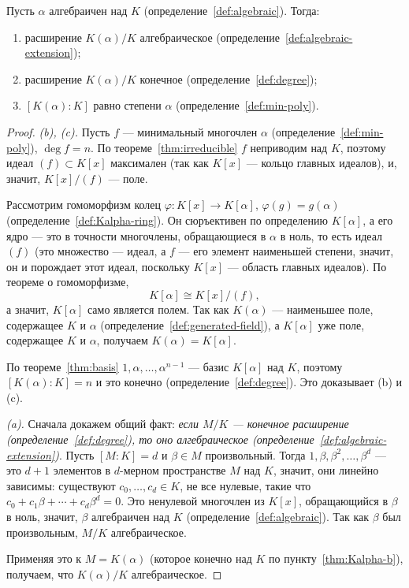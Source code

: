 \documentclass[12pt]{article}
\begin{document}
    \begin{theorem}\label{thm:Kalpha}
    	Пусть $\alpha$ алгебраичен над $K$ (определение~\ref{def:algebraic}). Тогда:
    	\begin{enumerate}
    		\item[(a)] \label{thm:Kalpha-a} расширение $K(\alpha)/K$ алгебраическое (определение~\ref{def:algebraic-extension});
    		\item[(b)] \label{thm:Kalpha-b} расширение $K(\alpha)/K$ конечное (определение~\ref{def:degree});
    		\item[(c)] \label{thm:Kalpha-c} $[K(\alpha):K]$ равно степени $\alpha$ (определение~\ref{def:min-poly}).
    	\end{enumerate}
    \end{theorem}
    \begin{proof}
    	\emph{(b), (c).} Пусть $f$ --- минимальный многочлен $\alpha$ (определение~\ref{def:min-poly}), $\deg f = n$. По теореме~\ref{thm:irreducible} $f$ неприводим над $K$, поэтому идеал $(f) \subset K[x]$ максимален (так как $K[x]$ --- кольцо главных идеалов), и, значит, $K[x]/(f)$ --- поле.
    
    	Рассмотрим гомоморфизм колец $\varphi: K[x] \to K[\alpha]$, $\varphi(g) = g(\alpha)$ (определение~\ref{def:Kalpha-ring}). Он сюръективен по определению $K[\alpha]$, а его ядро --- это в точности многочлены, обращающиеся в $\alpha$ в ноль, то есть идеал $(f)$ (это множество --- идеал, а $f$ --- его элемент наименьшей степени, значит, он и порождает этот идеал, поскольку $K[x]$ --- область главных идеалов). По теореме о гомоморфизме,
    	\[
    	K[\alpha] \cong K[x]/(f),
    	\]
    	а значит, $K[\alpha]$ само является полем. Так как $K(\alpha)$ --- наименьшее поле, содержащее $K$ и $\alpha$ (определение~\ref{def:generated-field}), а $K[\alpha]$ уже поле, содержащее $K$ и $\alpha$, получаем $K(\alpha) = K[\alpha]$.
    
    	По теореме~\ref{thm:basis} $1, \alpha, \ldots, \alpha^{n-1}$ --- базис $K[\alpha]$ над $K$, поэтому $[K(\alpha):K] = n$ и это конечно (определение~\ref{def:degree}). Это доказывает (b) и (c).
    
    	\emph{(a).} Сначала докажем общий факт: \emph{если $M/K$ --- конечное расширение (определение~\ref{def:degree}), то оно алгебраическое (определение~\ref{def:algebraic-extension})}\label{lem:finite-algebraic}. Пусть $[M:K] = d$ и $\beta \in M$ произвольный. Тогда $1, \beta, \beta^2, \ldots, \beta^d$ --- это $d+1$ элементов в $d$-мерном пространстве $M$ над $K$, значит, они линейно зависимы: существуют $c_0, \ldots, c_d \in K$, не все нулевые, такие что $c_0 + c_1\beta + \cdots + c_d\beta^d = 0$. Это ненулевой многочлен из $K[x]$, обращающийся в $\beta$ в ноль, значит, $\beta$ алгебраичен над $K$ (определение~\ref{def:algebraic}). Так как $\beta$ был произвольным, $M/K$ алгебраическое.
    
    	Применяя это к $M = K(\alpha)$ (которое конечно над $K$ по пункту~\ref{thm:Kalpha-b}), получаем, что $K(\alpha)/K$ алгебраическое.
    \end{proof}
    
\end{document}
